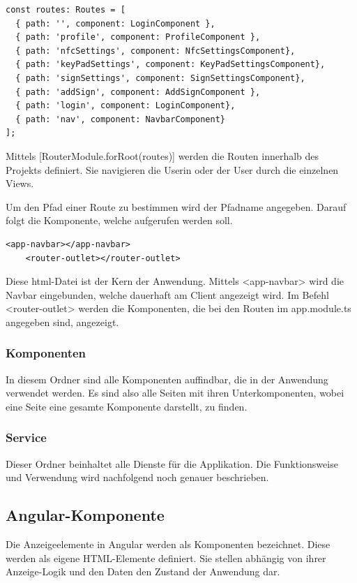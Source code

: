 \begin{lstlisting}[caption=Routing der Komponenten in der app.module.ts]
const routes: Routes = [
  { path: '', component: LoginComponent },
  { path: 'profile', component: ProfileComponent },
  { path: 'nfcSettings', component: NfcSettingsComponent},
  { path: 'keyPadSettings', component: KeyPadSettingsComponent},
  { path: 'signSettings', component: SignSettingsComponent},
  { path: 'addSign', component: AddSignComponent },
  { path: 'login', component: LoginComponent},
  { path: 'nav', component: NavbarComponent}
];
\end{lstlisting}

Mittels [RouterModule.forRoot(routes)] werden die Routen innerhalb des Projekts definiert. Sie navigieren die Userin oder der User durch die einzelnen Views.

Um den Pfad einer Route zu bestimmen wird der Pfadname angegeben.  Darauf folgt die Komponente, welche aufgerufen werden soll.

\begin{lstlisting}[caption=app.component.html]
    <app-navbar></app-navbar>
    <router-outlet></router-outlet>    
\end{lstlisting}

Diese html-Datei ist der Kern der Anwendung. Mittels <app-navbar> wird die Navbar eingebunden, welche dauerhaft am Client angezeigt wird. Im Befehl <router-outlet> werden die Komponenten, die bei den Routen im app.module.ts angegeben sind, angezeigt.

\subsubsection{Komponenten}
In diesem Ordner sind alle Komponenten auffindbar, die in der Anwendung verwendet werden. Es sind also alle Seiten mit ihren Unterkomponenten, wobei eine Seite eine gesamte Komponente darstellt, zu finden.

\subsubsection{Service}
Dieser Ordner beinhaltet alle Dienste für die Applikation. Die Funktionsweise und Verwendung wird nachfolgend noch genauer beschrieben.

\subsection{Angular-Komponente}
Die Anzeigeelemente in Angular werden als Komponenten bezeichnet. Diese werden als eigene HTML-Elemente definiert. Sie stellen abhängig von ihrer Anzeige-Logik und den Daten den Zustand der Anwendung dar.

